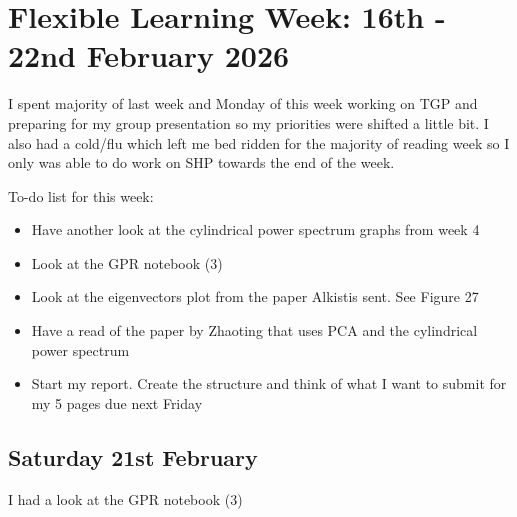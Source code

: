 \section{Flexible Learning Week: 16th - 22nd February 2026}

I spent majority of last week and Monday of this week working on TGP and preparing for my group presentation so my priorities were shifted a little bit. I also had a cold/flu which left me bed ridden for the majority of reading week so I only was able to do work on SHP towards the end of the week.

To-do list for this week:

\begin{itemize}
    \item Have another look at the cylindrical power spectrum graphs from week 4
    \item Look at the GPR notebook (3)
    \item Look at the eigenvectors plot from the paper Alkistis sent. See Figure 27
    \item Have a read of the paper by Zhaoting that uses PCA and the cylindrical power spectrum
    \item Start my report. Create the structure and think of what I want to submit for my 5 pages due next Friday
\end{itemize}

\subsection{Saturday 21st February}

I had a look at the GPR notebook (3)

